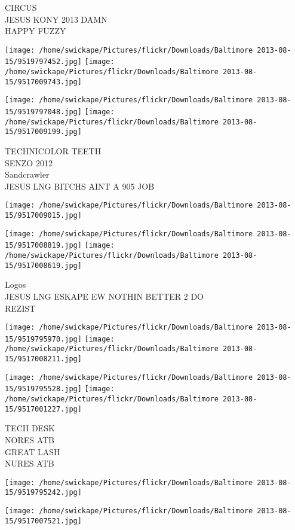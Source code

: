 \documentclass[10pt,letterpaper]{article}
\begin{document}
CIRCUS\\
JESUS KONY 2013 DAMN\\
HAPPY FUZZY
\pagebreak

\texttt{[image: /home/swickape/Pictures/flickr/Downloads/Baltimore 2013-08-15/9519797452.jpg]}
\texttt{[image: /home/swickape/Pictures/flickr/Downloads/Baltimore 2013-08-15/9517009743.jpg]}

\texttt{[image: /home/swickape/Pictures/flickr/Downloads/Baltimore 2013-08-15/9519797048.jpg]}
\texttt{[image: /home/swickape/Pictures/flickr/Downloads/Baltimore 2013-08-15/9517009199.jpg]}

TECHNICOLOR TEETH\\
SENZO 2012\\
Sandcrawler\\
JESUS LNG BITCHS AINT A 905 JOB
\pagebreak

\texttt{[image: /home/swickape/Pictures/flickr/Downloads/Baltimore 2013-08-15/9517009015.jpg]}

\vspace{0.25in}
\texttt{[image: /home/swickape/Pictures/flickr/Downloads/Baltimore 2013-08-15/9517008819.jpg]}
\texttt{[image: /home/swickape/Pictures/flickr/Downloads/Baltimore 2013-08-15/9517008619.jpg]}

Logos\\
JESUS LNG ESKAPE EW NOTHIN BETTER 2 DO\\
REZIST
\pagebreak

\texttt{[image: /home/swickape/Pictures/flickr/Downloads/Baltimore 2013-08-15/9519795970.jpg]}
\texttt{[image: /home/swickape/Pictures/flickr/Downloads/Baltimore 2013-08-15/9517008211.jpg]}

\texttt{[image: /home/swickape/Pictures/flickr/Downloads/Baltimore 2013-08-15/9519795528.jpg]}
\texttt{[image: /home/swickape/Pictures/flickr/Downloads/Baltimore 2013-08-15/9517001227.jpg]}

TECH DESK\\
NORES ATB\\
GREAT LASH\\
NURES ATB
\pagebreak

\texttt{[image: /home/swickape/Pictures/flickr/Downloads/Baltimore 2013-08-15/9519795242.jpg]}

\vspace{0.25in}
\texttt{[image: /home/swickape/Pictures/flickr/Downloads/Baltimore 2013-08-15/9517007521.jpg]}
\end{document}
